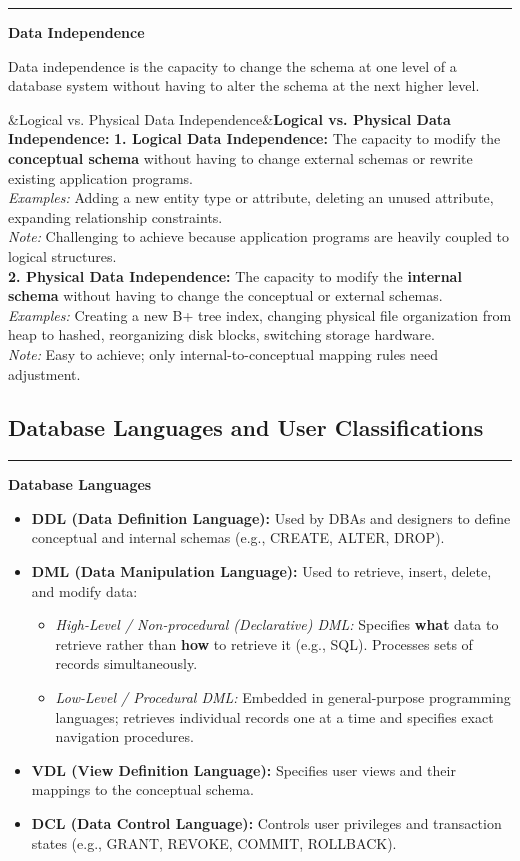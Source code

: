 \documentclass[11pt,a4paper]{article}
\newcommand{\ic}[1]{\mbox{\colorbox{AnthCodeBG}{\footnotesize\ttfamily\textcolor{AnthBlue}{#1}}}}
\newcommand{\concept}[1]{%
  \vspace{3pt}\noindent\textcolor{AnthGreen}{\rule{3.5pt}{10pt}}\enspace
  \textbf{\sffamily\color{AnthDark}#1}\par\vspace{2pt}%
}
\newenvironment{Def}[1][]{\begin{tcolorbox}[defbox]\ifx&#1&\else\textbf{\color{AnthOrange}#1:}\enspace\fi}{\end{tcolorbox}}
\begin{document}
\concept{Data Independence}
Data independence is the capacity to change the schema at one level of a database system without having to alter the schema at the next higher level.

\begin{Def}[Logical vs. Physical Data Independence]
\textbf{1. Logical Data Independence:}
The capacity to modify the \textbf{conceptual schema} without having to change external schemas or rewrite existing application programs.\\
\emph{Examples:} Adding a new entity type or attribute, deleting an unused attribute, expanding relationship constraints.\\
\emph{Note:} Challenging to achieve because application programs are heavily coupled to logical structures.\\

\textbf{2. Physical Data Independence:}
The capacity to modify the \textbf{internal schema} without having to change the conceptual or external schemas.\\
\emph{Examples:} Creating a new B+ tree index, changing physical file organization from heap to hashed, reorganizing disk blocks, switching storage hardware.\\
\emph{Note:} Easy to achieve; only internal-to-conceptual mapping rules need adjustment.
\end{Def}

\subsection{Database Languages and User Classifications}

\concept{Database Languages}
\begin{itemize}
  \item \textbf{DDL (Data Definition Language):} Used by DBAs and designers to define conceptual and internal schemas (e.g., \ic{CREATE}, \ic{ALTER}, \ic{DROP}).
  \item \textbf{DML (Data Manipulation Language):} Used to retrieve, insert, delete, and modify data:
    \begin{itemize}
      \item \emph{High-Level / Non-procedural (Declarative) DML:} Specifies \textbf{what} data to retrieve rather than \textbf{how} to retrieve it (e.g., SQL). Processes sets of records simultaneously.
      \item \emph{Low-Level / Procedural DML:} Embedded in general-purpose programming languages; retrieves individual records one at a time and specifies exact navigation procedures.
    \end{itemize}
  \item \textbf{VDL (View Definition Language):} Specifies user views and their mappings to the conceptual schema.
  \item \textbf{DCL (Data Control Language):} Controls user privileges and transaction states (e.g., \ic{GRANT}, \ic{REVOKE}, \ic{COMMIT}, \ic{ROLLBACK}).
\end{itemize}
\end{document}
